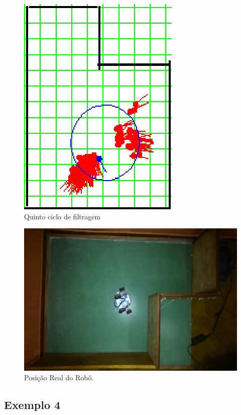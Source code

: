\begin{figure}[H]
  \centering
  \includegraphics[scale=1]{figuras/cen3_ex3/6.eps}
  \caption[Quinto Ciclo de Filtragem]{Quinto ciclo de filtragem}
  \label{img:cen3_ex3_6}
\end{figure}

\begin{figure}[H]
  \centering
  \includegraphics[scale=1]{figuras/cen3_ex3/real.eps}
  \caption[Posição Real do Robô]{Posição Real do Robô.}
  \label{img:cen3_ex3_real}
\end{figure}

\subsection{Exemplo 4}

